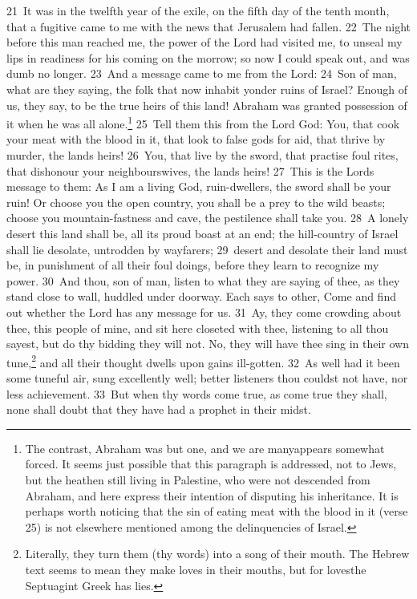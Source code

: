 \documentclass[10pt]{book} %
\begin{document}
\textcolor{benred8}{21}~It was in the twelfth year of the exile, on the fifth day of the tenth month, that a fugitive came to me with the news that Jerusalem had fallen. \textcolor{benred8}{22}~The night before this man reached me, the power of the Lord had visited me, to unseal my lips in readiness for his coming on the morrow; so now I could speak out, and was dumb no longer. \textcolor{benred8}{23}~And a message came to me from the Lord: \textcolor{benred8}{24}~Son of man, what are they saying, the folk that now inhabit yonder ruins of Israel? Enough of us, they say, to be the true heirs of this land! Abraham was granted possession of it when he was all alone.\footnote[1]{The contrast, \textasciigrave Abraham was but one, and we are many\textquotesingle  appears somewhat forced. It seems just possible that this paragraph is addressed, not to Jews, but the heathen still living in Palestine, who were not descended from Abraham, and here express their intention of disputing his inheritance. It is perhaps worth noticing that the sin of eating meat with the blood in it (verse 25) is not elsewhere mentioned among the delinquencies of Israel.} \textcolor{benred8}{25}~Tell them this from the Lord God: You, that cook your meat with the blood in it, that look to false gods for aid, that thrive by murder, the land\textquotesingle s heirs! \textcolor{benred8}{26}~You, that live by the sword, that practise foul rites, that dishonour your neighbours\textquotesingle  wives, the land\textquotesingle s heirs! \textcolor{benred8}{27}~This is the Lord\textquotesingle s message to them: As I am a living God, ruin-dwellers, the sword shall be your ruin! Or choose you the open country, you shall be a prey to the wild beasts; choose you mountain-fastness and cave, the pestilence shall take you. \textcolor{benred8}{28}~A lonely desert this land shall be, all its proud boast at an end; the hill-country of Israel shall lie desolate, untrodden by wayfarers; \textcolor{benred8}{29}~desert and desolate their land must be, in punishment of all their foul doings, before they learn to recognize my power.
\textcolor{benred8}{30}~And thou, son of man, listen to what they are saying of thee, as they stand close to wall, huddled under doorway. Each says to other, Come and find out whether the Lord has any message for us. \textcolor{benred8}{31}~Ay, they come crowding about thee, this people of mine, and sit here closeted with thee, listening to all thou sayest, but do thy bidding they will not. No, they will have thee sing in their own tune,\footnote[2]{Literally, \textasciigrave they turn them (thy words) into a song of their mouth\textquotesingle . The Hebrew text seems to mean \textasciigrave they make loves in their mouths\textquotesingle , but for \textasciigrave loves\textquotesingle  the Septuagint Greek has \textasciigrave lies\textquotesingle .} and all their thought dwells upon gains ill-gotten. \textcolor{benred8}{32}~As well had it been some tuneful air, sung excellently well; better listeners thou couldst not have, nor less achievement. \textcolor{benred8}{33}~But when thy words come true, as come true they shall, none shall doubt that they have had a prophet in their midst.
\end{document}
